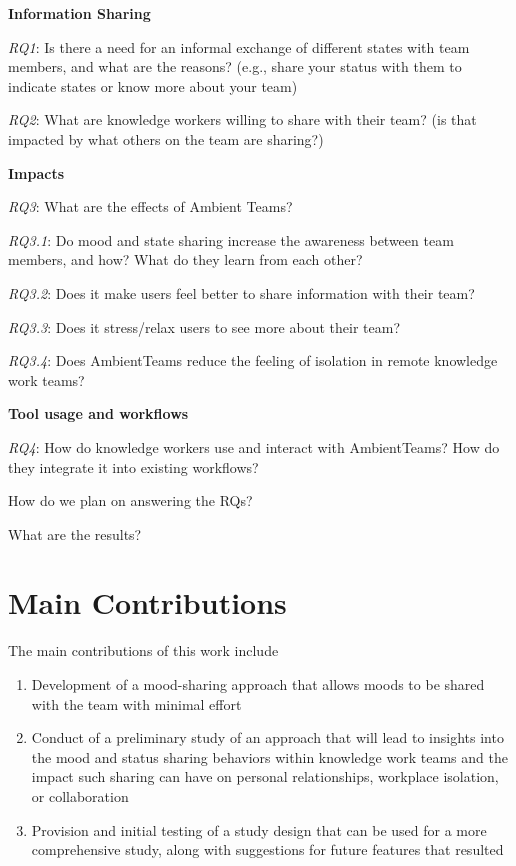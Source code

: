 \medskip\noindent\textbf{Information Sharing}

\smallskip\noindent\textit{RQ1}: Is there a need for an informal exchange of different states with team members, and what are the reasons? (e.g., share your status with them to indicate states or know more about your team)

\smallskip\noindent\textit{RQ2}: What are knowledge workers willing to share with their team? (is that impacted by what others on the team are sharing?)

\medskip\noindent\textbf{Impacts}

\smallskip\noindent\textit{RQ3}: What are the effects of Ambient Teams?

\setlength{\leftskip}{0.5cm}
\smallskip\noindent\textit{RQ3.1}: Do mood and state sharing increase the awareness between team members, and how? What do they learn from each other?

\smallskip\noindent\textit{RQ3.2}: Does it make users feel better to share information with their team?

\smallskip\noindent\textit{RQ3.3}: Does it stress/relax users to see more about their team?

\smallskip\noindent\textit{RQ3.4}: Does AmbientTeams reduce the feeling of isolation in remote knowledge work teams?

\setlength{\leftskip}{0pt}

\medskip\noindent\textbf{Tool usage and workflows}

\smallskip\noindent\textit{RQ4}: How do knowledge workers use and interact with AmbientTeams? How do they integrate it into existing workflows?


How do we plan on answering the RQs?

What are the results?

\section{Main Contributions}
The main contributions of this work include
\begin{enumerate}
    \item Development of a mood-sharing approach that allows moods to be shared with the team with minimal effort
    \item Conduct of a preliminary study of an approach that will lead to insights into the mood and status sharing behaviors within knowledge work teams and the impact such sharing can have on personal relationships, workplace isolation, or collaboration
    \item Provision and initial testing of a study design that can be used for a more comprehensive study, along with suggestions for future features that resulted
\end{enumerate}
